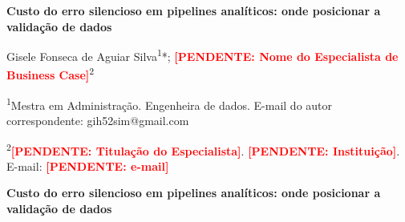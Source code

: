 \documentclass[11pt,a4paper]{article}
\newcommand{\pend}[1]{\textcolor{red}{\textbf{[PENDENTE: #1]}}}
\begin{document}
\begin{singlespace}
\thispagestyle{bcpadrao}
\vspace*{1.5cm}

\begin{center}
\textbf{Custo do erro silencioso em pipelines analíticos: onde posicionar a
validação de dados}
\end{center}

\vspace{2\baselineskip}

\begin{center}
Gisele Fonseca de Aguiar Silva\textsuperscript{1}*;
\pend{Nome do Especialista de Business Case}\textsuperscript{2}
\end{center}

\vspace{\baselineskip}

{\fontsize{9}{11}\selectfont\RaggedRight
\noindent\textsuperscript{1}Mestra em Administração. Engenheira de dados.
E-mail do autor correspondente: gih52sim@gmail.com\par
\noindent\textsuperscript{2}\pend{Titulação do Especialista}.
\pend{Instituição}. E-mail: \pend{e-mail}\par
}
\end{singlespace}

\newpage

\begin{singlespace}
\begin{center}
\textbf{Custo do erro silencioso em pipelines analíticos: onde posicionar a
validação de dados}
\end{center}
\end{singlespace}
\end{document}
